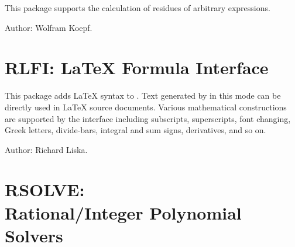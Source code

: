 This package supports the calculation of residues of arbitrary
expressions.

Author: Wolfram Koepf.


\fi

\newpage

\section{RLFI: \REDUCE \LaTeX{} Formula Interface}

This package adds \LaTeX{} syntax to \REDUCE.  Text generated by \REDUCE in
this mode can be directly used in \LaTeX{} source documents.  Various
mathematical constructions are supported by the interface including
subscripts, superscripts, font changing, Greek letters, divide-bars,
integral and sum signs, derivatives, and so on.

Author: Richard Liska.




\newpage

\iffalse
\section{ROOTS: A \REDUCE Root Finding Package}
\indexpackage{ROOTS}

This root finding package can be used to find some or all of the roots of a
univariate polynomial with real or complex coefficients, to the accuracy
specified by the user.

It is designed so that it can be used as an independent package, or it may
be called from {\tt SOLVE} if {\tt ROUNDED} is on. For example,
the evaluation of
\begin{verbatim}
        on rounded,complex;
        solve(x**3+x+5,x);
\end{verbatim}
yields the result
\begin{verbatim}
    {X= - 1.51598,X=0.75799 + 1.65035*I,X=0.75799 - 1.65035*I}
\end{verbatim}

This package loads automatically.

Author: Stanley L. Kameny.



\newpage
\fi

\iffalse
\section[RSOLVE: Rational/Integer Polynomial Solvers]%
        {RSOLVE: \protect\\ Rational/Integer Polynomial Solvers}

